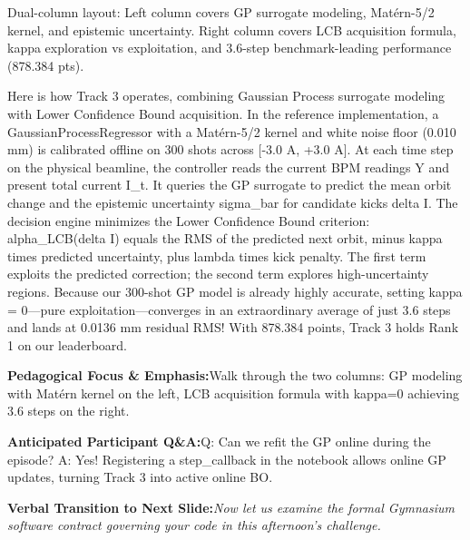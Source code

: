 \documentclass[11pt,a4paper]{article}
\begin{document}
\vspace{0.2em}
\begin{tcolorbox}[colback=lightbg,colframe=bordergray,title={\footnotesize\bfseries\color{darkgray}Slide Visual Blueprint},fontupper=\small,left=6pt,right=6pt,top=2.5pt,bottom=2.5pt,boxrule=0.6pt,arc=2.5pt]
Dual-column layout: Left column covers GP surrogate modeling, Matérn-5/2 kernel, and epistemic uncertainty. Right column covers LCB acquisition formula, kappa exploration vs exploitation, and 3.6-step benchmark-leading performance (878.384 pts).
\end{tcolorbox}
\vspace{0.2em}
\begin{tcolorbox}[colback=white,colframe=primaryblue,title={\footnotesize\bfseries\color{white}Spoken Presenter Script},fontupper=\small,left=6pt,right=6pt,top=3pt,bottom=3pt,boxrule=0.8pt,arc=2.5pt]
Here is how Track 3 operates, combining Gaussian Process surrogate modeling with Lower Confidence Bound acquisition. In the reference implementation, a GaussianProcessRegressor with a Matérn-5/2 kernel and white noise floor (0.010 mm) is calibrated offline on 300 shots across [-3.0 A, +3.0 A]. At each time step on the physical beamline, the controller reads the current BPM readings Y and present total current I\_t. It queries the GP surrogate to predict the mean orbit change and the epistemic uncertainty sigma\_bar for candidate kicks delta I. The decision engine minimizes the Lower Confidence Bound criterion: alpha\_LCB(delta I) equals the RMS of the predicted next orbit, minus kappa times predicted uncertainty, plus lambda times kick penalty. The first term exploits the predicted correction; the second term explores high-uncertainty regions. Because our 300-shot GP model is already highly accurate, setting kappa = 0—pure exploitation—converges in an extraordinary average of just 3.6 steps and lands at 0.0136 mm residual RMS! With 878.384 points, Track 3 holds Rank 1 on our leaderboard.
\end{tcolorbox}
\vspace{0.2em}
\begin{tcolorbox}[colback=lightbg,colframe=bordergray,left=6pt,right=6pt,top=3pt,bottom=3pt,boxrule=0.6pt,arc=2.5pt]
\small
\noindent\textbf{\color{navy}Pedagogical Focus \& Emphasis:}\enspace Walk through the two columns: GP modeling with Matérn kernel on the left, LCB acquisition formula with kappa=0 achieving 3.6 steps on the right.\par\vspace{0.3em}
\noindent\textbf{\color{successgreen}Anticipated Participant Q\&A:}\enspace Q: Can we refit the GP online during the episode? A: Yes! Registering a step\_callback in the notebook allows online GP updates, turning Track 3 into active online BO.\par\vspace{0.3em}
\noindent\textbf{\color{accent}Verbal Transition to Next Slide:}\enspace \emph{Now let us examine the formal Gymnasium software contract governing your code in this afternoon's challenge.}
\end{tcolorbox}
\end{document}
